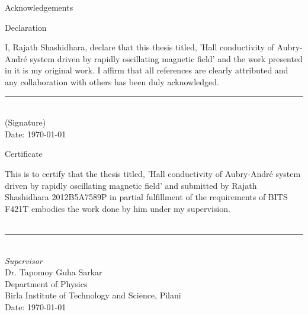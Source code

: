 \thispagestyle{empty}

\begin{center}
 \LARGE
 Acknowledgements
\end{center} \normalsize \vspace{2.0cm}
\blindtext
\vfil

\clearpage
\thispagestyle{empty}
\begin{center}
  \LARGE
  Declaration
\end{center} \normalsize \vspace{2.0cm}
I, Rajath Shashidhara, declare that this thesis titled, 
'Hall conductivity of Aubry-Andr\'e system driven by rapidly oscillating magnetic field' and 
the work presented in it is my original work. I affirm that all references are clearly attributed and 
any collaboration with others has been duly acknowledged.
\vspace{5.0cm}\\
\rule[1em]{25em}{0.5pt}\\
(Signature) \vspace{0.5cm}\\
Date: \today \\
\vfil

\clearpage
\thispagestyle{empty}

\begin{center}
  \LARGE
  Certificate
\end{center} \normalsize \vspace{2.0cm}
This is to certify that the thesis titled,  
'Hall conductivity of Aubry-Andr\'e system driven by rapidly oscillating magnetic field' and submitted by
 Rajath Shashidhara 2012B5A7589P in partial fulfillment of the requirements of BITS F421T embodies the work done
 by him under my supervision.\\
\vspace{5.0cm}\\
\rule[1em]{25em}{0.5pt}\\
\large
\emph{Supervisor} \vspace{0.5cm}\\
Dr. Tapomoy Guha Sarkar\\
\normalsize
Department of Physics\\
Birla Institute of Technology and Science, Pilani \vspace{0.5cm}\\
Date: \today \\
\vfil
\tableofcontents